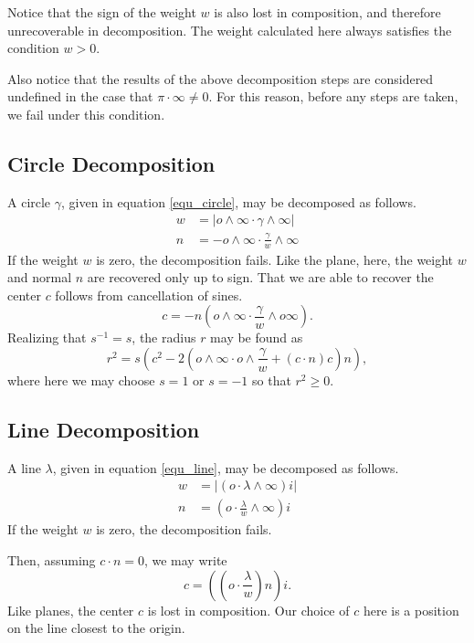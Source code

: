 \documentclass[12pt]{article}
\newcommand{\nvao}{o}
\newcommand{\nvai}{\infty}
\begin{document}
Notice that the sign of the weight $w$ is also lost in composition, and therefore
unrecoverable in decomposition.  The weight calculated here always satisfies
the condition $w>0$.

Also notice that the results of the above decomposition steps are considered
undefined in the case that $\pi\cdot\nvai\neq 0$.  For this reason, before
any steps are taken, we fail under this condition.

\subsection{Circle Decomposition}

A circle $\gamma$, given in equation \eqref{equ_circle}, may be decomposed as follows.
\begin{align}
w &= |\nvao\wedge\nvai\cdot\gamma\wedge\nvai| \\
n &= -\nvao\wedge\nvai\cdot\frac{\gamma}{w}\wedge\nvai
\end{align}
If the weight $w$ is zero, the decomposition fails.
Like the plane, here, the weight $w$ and normal $n$ are recovered
only up to sign.  That we are able to recover the center $c$ follows
from cancellation of sines.
\begin{equation}
c = -n\left(\nvao\wedge\nvai\cdot
\frac{\gamma}{w}\wedge\nvao\nvai\right).
\end{equation}
Realizing that $s^{-1}=s$, the radius $r$ may be found as
\begin{equation}
r^2=s\left(c^2-2\left(\nvao\wedge\nvai\cdot\nvao\wedge\frac{\gamma}{w}+
(c\cdot n)c\right)n\right),
\end{equation}
where here we may choose $s=1$ or $s=-1$ so that $r^2\geq 0$.

\subsection{Line Decomposition}

A line $\lambda$, given in equation \eqref{equ_line}, may be decomposed
as follows.
\begin{align}
w &= |(\nvao\cdot\lambda\wedge\nvai)i| \\
n &= \left(\nvao\cdot\frac{\lambda}{w}\wedge\nvai\right)i
\end{align}
If the weight $w$ is zero, the decomposition fails.

Then, assuming $c\cdot n=0$, we may write
\begin{equation}
c = \left(\left(\nvao\cdot\frac{\lambda}{w}\right)n\right)i.
\end{equation}
Like planes, the center $c$ is lost in composition.  Our choice
of $c$ here is a position on the line closest to the origin.
\end{document}

